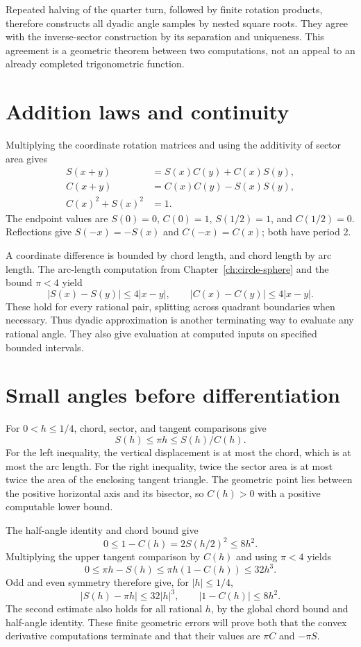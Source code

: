 Repeated halving of the quarter turn, followed by finite rotation products,
therefore constructs all dyadic angle samples by nested square roots.
They agree with the inverse-sector construction by its separation and
uniqueness.  This agreement is a geometric theorem between two computations,
not an appeal to an already completed trigonometric function.

\section{Addition laws and continuity}
Multiplying the coordinate rotation matrices and using the additivity of
sector area gives
\begin{align*}
 S(x+y)&=S(x)C(y)+C(x)S(y),\\
 C(x+y)&=C(x)C(y)-S(x)S(y),\\
 C(x)^2+S(x)^2&=1.
\end{align*}
The endpoint values are
$S(0)=0$, $C(0)=1$, $S(1/2)=1$, and $C(1/2)=0$.
Reflections give $S(-x)=-S(x)$ and $C(-x)=C(x)$; both have period $2$.

A coordinate difference is bounded by chord length, and chord length by
arc length.  The arc-length computation from Chapter~\ref{ch:circle-sphere}
and the bound $\pi<4$ yield
\[
 |S(x)-S(y)|\le4|x-y|,\qquad
 |C(x)-C(y)|\le4|x-y|.
\]
These hold for every rational pair, splitting across quadrant boundaries
when necessary.  Thus dyadic approximation is another terminating way to
evaluate any rational angle.  They also give evaluation at computed inputs
on specified bounded intervals.

\section{Small angles before differentiation}
\label{sec:geometric-small-angle}
For $0<h\le1/4$, chord, sector, and tangent comparisons give
\[
 S(h)\le\pi h\le S(h)/C(h).
\]
For the left inequality, the vertical displacement is at most the chord,
which is at most the arc length.  For the right inequality, twice the
sector area is at most twice the area of the enclosing tangent triangle.
The geometric point lies between the positive horizontal axis and its
bisector, so $C(h)>0$ with a positive computable lower bound.

The half-angle identity and chord bound give
\[
 0\le1-C(h)=2S(h/2)^2\le8h^2.
\]
Multiplying the upper tangent comparison by $C(h)$ and using $\pi<4$
yields
\[
 0\le\pi h-S(h)\le\pi h(1-C(h))\le32h^3.
\]
Odd and even symmetry therefore give, for $|h|\le1/4$,
\[
 |S(h)-\pi h|\le32|h|^3,\qquad |1-C(h)|\le8h^2.
\]
The second estimate also holds for all rational $h$, by the global chord
bound and half-angle identity.  These finite geometric errors will prove
both that the convex derivative computations terminate and that their
values are $\pi C$ and $-\pi S$.

